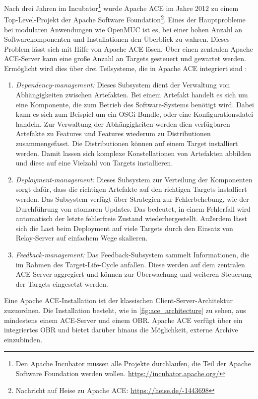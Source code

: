 Nach drei Jahren im Incubator\footnote{Den Apache Incubator müssen alle Projekte durchlaufen, die Teil der Apache Software Foundation werden wollen. \url{https://incubator.apache.org/}}
wurde Apache ACE im Jahre 2012 zu einem Top-Level-Projekt der Apache Software Foundation\footnote{Nachricht auf Heise zu Apache ACE: \url{https://heise.de/-1443698}}.
Eines der Hauptprobleme bei modularen Anwendungen wie OpenMUC ist es, bei einer hohen Anzahl an Softwarekomponenten und Installationen den Überblick zu wahren.
Dieses Problem lässt sich mit Hilfe von Apache ACE lösen. Über einen zentralen Apache ACE-Server kann eine große Anzahl an Targets gesteuert und gewartet werden.
Ermöglicht wird dies über drei Teilsysteme, die in Apache ACE integriert sind \cite{ace}:
\begin{enumerate}
 \item \textit{Dependency-management:} Dieses Subsystem dient der Verwaltung von Abhängigkeiten zwischen Artefakten.
 Bei einem Artefakt handelt es sich um eine Komponente, die zum Betrieb des Software-Systems benötigt wird.
 Dabei kann es sich zum Beispiel um ein OSGi-Bundle, oder eine Konfigurationsdatei handeln.
 Zur Verwaltung der Abhängigkeiten werden dien verfügbaren Artefakte zu Features und Features wiederum zu Distributionen zusammengefasst.
 Die Distributionen können auf einem Target installiert werden. Damit lassen sich komplexe Konstellationen von Artefakten abbilden und diese auf eine Vielzahl von Targets installieren.
 \item \textit{Deployment-management:} Dieses Subsystem zur Verteilung der Komponenten sorgt dafür, dass die richtigen Artefakte auf den richtigen Targets installiert werden. 
 Das Subsystem verfügt über Strategien zur Fehlerbehebung, wie der Durchführung von atomaren Updates. %
 Das bedeutet, in einem Fehlerfall wird automatisch der letzte fehlerfreie Zustand wiederhergestellt.
 Außerdem lässt sich die Last beim Deployment auf viele Targets durch den Einsatz von Relay-Server auf einfachem Wege skalieren.
 \item \textit{Feedback-management:} Das Feedback-Subsystem sammelt Informationen, die im Rahmen des Target-Life-Cycle anfallen. Diese werden auf dem zentralen ACE Server aggregiert 
 und können zur Überwachung und weiteren Steuerung der Targets eingesetzt werden.
\end{enumerate}

Eine Apache ACE-Installation ist der klassischen Client-Server-Architektur zuzuordnen. 
Die Installation besteht, wie in \autoref{fig:ace_architecture} zu sehen, aus mindestens einem ACE-Server und einem \ac{OBR}.
Apache ACE verfügt über ein integriertes \ac{OBR} und bietet darüber hinaus die Möglichkeit, externe Archive einzubinden.

